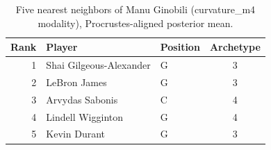 \begin{table}[htbp]
  \centering\small
  \begin{tabular}{rllc}
    \toprule
    Rank & Player & Position & Archetype \\
    \midrule
    1 & Shai Gilgeous-Alexander & G & 3 \\
    2 & LeBron James & G & 3 \\
    3 & Arvydas Sabonis & C & 4 \\
    4 & Lindell Wigginton & G & 4 \\
    5 & Kevin Durant & G & 3 \\
    \bottomrule
  \end{tabular}
  \caption{Five nearest neighbors of Manu Ginobili (curvature_m4 modality), Procrustes-aligned posterior mean.}
  \label{tab:Manu_Ginobili_neighbors_curvature_m4}
\end{table}

